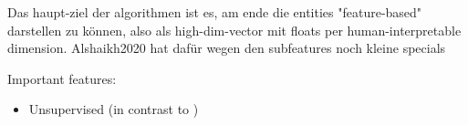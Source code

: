 


Das haupt-ziel der algorithmen ist es, am ende die entities "feature-based" darstellen zu können, also als high-dim-vector mit floats per human-interpretable dimension. Alshaikh2020 hat dafür wegen den subfeatures noch kleine specials

Important features:
\begin{itemize}
	\item Unsupervised (in contrast to \textcite{VISR12})
\end{itemize}


